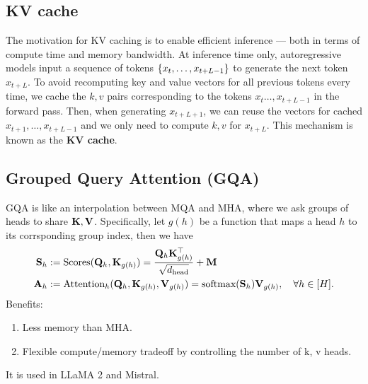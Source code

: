 \documentclass[11pt]{article}  %
\begin{document}
\subsection{KV cache}
The motivation for KV caching is to enable efficient inference — both in terms of compute time and memory bandwidth.
At inference time only, autoregressive models input a sequence of tokens $\left\{ x_t, \hdots, x_{t + L - 1} \right\}$ to generate the next token $x_{t + L}$. 
To avoid recomputing key and value vectors for all previous tokens every time, we cache the $k, v$ pairs corresponding to the tokens $x_t \hdots, x_{t + L - 1}$ in the forward pass.
Then, when generating $x_{t + L + 1}$, we can reuse the vectors for cached $x_{t + 1}, \hdots, x_{t + L - 1}$ and we only need to compute $k, v$ for $x_{t + L}$. 
This mechanism is known as the \textbf{KV cache}.


\subsection{Grouped Query Attention (GQA)}
GQA is like an interpolation between MQA and MHA, where we ask groups of heads to share $\mathbf{K}, \mathbf{V}$.
Specifically, let $g(h)$ be a function that maps a head $h$ to its corrsponding group index, then we have 
\begin{align*}
  \mathbf{S}_h &:= \text{Scores}(\mathbf{Q}_h, \mathbf{K}_{g(h)}) = \frac{\mathbf{Q}_h\mathbf{K}^{\top}_{g(h)}}{\sqrt{d_{\text{head}}}} + \mathbf{M} \\
  \mathbf{A}_h &:= \text{Attention}_h (\mathbf{Q}_h, \mathbf{K}_{g(h)}, \mathbf{V}_{g(h)}) = \text{softmax}(\mathbf{S}_h)\mathbf{V}_{g(h)}, \quad \forall h \in [H]. 
\end{align*} 
Benefits:
\begin{enumerate}
  \item Less memory than MHA.
  \item Flexible compute/memory tradeoff by controlling the number of k, v heads.
\end{enumerate}
It is used in LLaMA 2 and Mistral.
\end{document}
